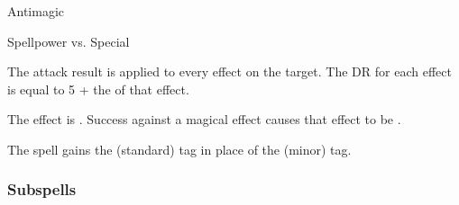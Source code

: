 \newpage
\begin{spellsection}{Antimagic}

\begin{spellcontent}

\begin{spelltargetinginfo}




\end{spelltargetinginfo}


\begin{spelleffects}




\begin{spellattack}{Spellpower vs. Special}


\spellspecial
The attack result is applied to every  effect on the target.
The DR for each effect is equal to 5 + the  of that effect.



\hit
The effect is .
Success against a magical effect causes that effect to be .



\end{spellattack}





\end{spelleffects}

\end{spellcontent}
\begin{spellfooter}


\end{spellfooter}
\begin{spellsubcontent}


\begin{spellcantrip}
The spell gains the  (standard) tag in place of the  (minor) tag.
\end{spellcantrip}


\end{spellsubcontent}
\end{spellsection}


\subsubsection{Subspells}


